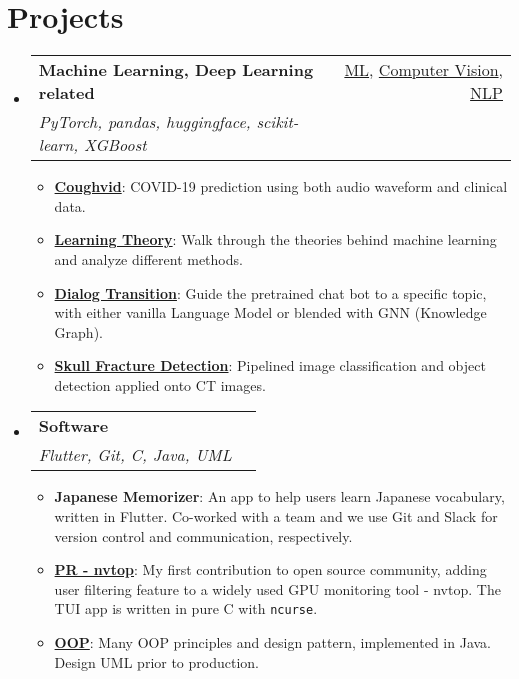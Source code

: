\documentclass[A4]{article}
\makeatletter
\newcommand{\resumeItem}[2]{
  \item\small{
    \textbf{#1}{: #2 \vspace{-2pt}}
  }
}
\newcommand{\resumeSubheading}[4]{
  \vspace{-1pt}\item
    \begin{tabular*}{0.97\textwidth}{l@{\extracolsep{\fill}}r}
      \textbf{#1} & #2 \\
      \textit{\small#3} & \textit{\small #4} \\
    \end{tabular*}\vspace{-5pt}
}
\newcommand{\resumeSubHeadingListStart}{\begin{itemize}[leftmargin=*]}
\newcommand{\resumeSubHeadingListEnd}{\end{itemize}}
\newcommand{\resumeItemListStart}{\begin{itemize}}
\newcommand{\resumeItemListEnd}{\end{itemize}\vspace{-5pt}}
\makeatother
\begin{document}
\section{Projects}
\resumeSubHeadingListStart
\resumeSubheading
{Machine Learning, Deep Learning related}
{\href{https://github.com/jeff999955/Machine-Learning-2021-Spring}{ML}, \href{https://github.com/jeff999955/DLCV-2021-Fall}{Computer Vision},
      \href{https://github.com/jeff999955/ADL-2022-Spring}{NLP}}
{PyTorch, pandas, huggingface, scikit-learn, XGBoost}{}
\resumeItemListStart
\resumeItem{\href{https://github.com/AI-LLZ}{Coughvid}}{COVID-19 prediction using both audio waveform and clinical data.}
\resumeItem{\href{https://neverloses.notion.site/HTML-0161da99ac5f4f0a9a00757ce07afb8f}{Learning Theory}}{Walk through the theories behind machine learning and analyze different methods.}
\resumeItem{\href{https://github.com/jeff999955/ADL-2022-Spring/tree/main/Final}{Dialog Transition}} {Guide the pretrained chat bot to a specific topic, with either vanilla Language Model or blended with GNN (Knowledge Graph).}
\resumeItem{\href{https://github.com/jeff999955/DLCV-2021-Fall/tree/main/Final_Project}{Skull Fracture Detection}}
{Pipelined image classification and object detection applied onto CT images.}
\resumeItemListEnd
\resumeSubheading
{Software}{}
{Flutter, Git, C, Java, UML}{}
\resumeItemListStart
\resumeItem{Japanese Memorizer}{An app to help users learn Japanese vocabulary, written in Flutter. Co-worked with a team and we use Git and Slack for version control and communication, respectively.}
\resumeItem{\href{https://github.com/Syllo/nvtop/pull/134\#issuecomment-1146659375}{PR - nvtop}}{My first contribution to open source community, adding user filtering feature to a widely used GPU monitoring tool - nvtop. The TUI app is written in pure C with \texttt{ncurse}.}
\resumeItem{\href{https://github.com/jeff999955/FOOP_2021}{OOP}}{Many OOP principles and design pattern, implemented in Java. Design UML prior to production.}
\resumeItemListEnd

\resumeSubHeadingListEnd
\end{document}
